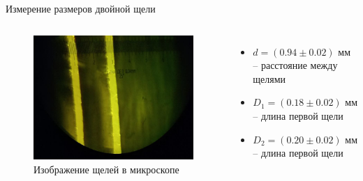 \documentclass[11pt]{beamer} %
\begin{document}
   \begin{frame}{Измерение размеров двойной щели}
   \begin{columns}
 
        \begin{figure}[H]
        \centering
            \includegraphics[width = \textwidth]{images/slit.png}
            \caption{Изображение щелей в микроскопе}
        \end{figure}

        \begin{itemize}
            \item $d = \left( 0.94 \pm 0.02 \right) \text{ мм}$ -- расстояние между щелями
            \item $D_1 = \left( 0.18 \pm 0.02 \right) \text{ мм}$ -- длина первой щели
            \item $D_2 = \left( 0.20 \pm 0.02 \right) \text{ мм}$ -- длина первой щели
        \end{itemize}
        
        \end{columns}
   \end{frame}
   
\end{document}
